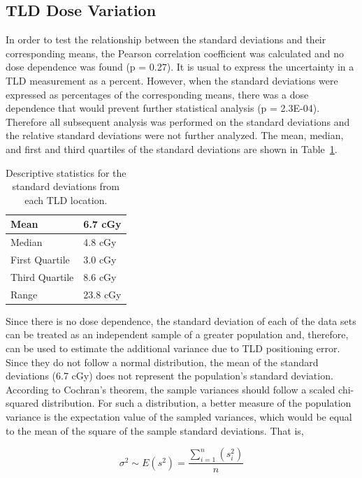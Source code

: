 \subsection{TLD Dose Variation}
In order to test the relationship between the standard deviations and their corresponding means, the Pearson correlation coefficient was calculated and no dose dependence was found (p = 0.27).    It is usual to express the uncertainty in a TLD measurement as a percent. However, when the standard deviations were expressed as percentages of the corresponding means, there was a dose dependence that would prevent further statistical analysis (p = 2.3E-04). Therefore all subsequent analysis was performed on the standard deviations and the relative standard deviations were not further analyzed. The mean, median, and first and third quartiles of the standard deviations are shown in Table~\ref{tab:descrip_stats}.

\begin{table}[h]
	\centering
	\caption{Descriptive statistics for the standard deviations from each TLD location.}
	\label{tab:descrip_stats}
	\begin{tabular}{|l|l|}
		\hline
		Mean           & 6.7 cGy  \\ \hline
		Median         & 4.8 cGy  \\ \hline
		First Quartile & 3.0 cGy  \\ \hline
		Third Quartile & 8.6 cGy  \\ \hline
		Range          & 23.8 cGy \\ \hline
	\end{tabular}
\end{table}

Since there is no dose dependence, the standard deviation of each of the data sets can be treated as an independent sample of a greater population and, therefore, can be used to estimate the additional variance due to TLD positioning error. Since they do not follow a normal distribution, the mean of the standard deviations (6.7 cGy) does not represent the population’s standard deviation. According to Cochran’s theorem,\cite{Knight1999} the sample variances should follow a scaled chi-squared distribution. For such a distribution, a better measure of the population variance is the expectation value of the sampled variances, which would be equal to the mean of the square of the sample standard deviations. That is,

\begin{equation}
	\label{eq:cochran}
	\sigma^2 \sim E\left(s^2\right) = \frac{\sum_{i=1}^n \left(s_i^2\right)}{n}
\end{equation}

